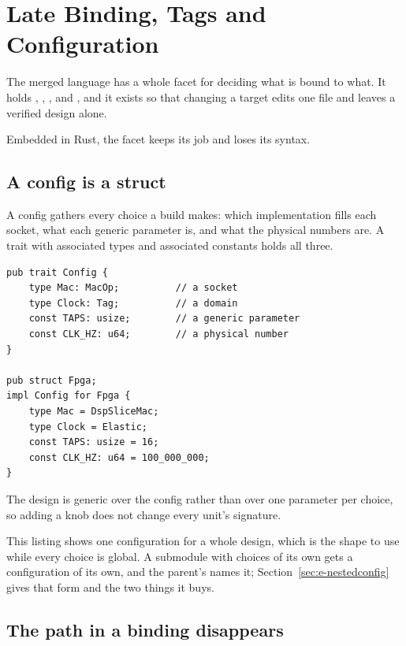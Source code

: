 \section{Late Binding, Tags and Configuration}
\label{sec:e-binding}

The merged language has a whole facet for deciding what is bound to what.
It holds , , ,  and
, and it exists so that changing a target edits one file and
leaves a verified design alone.

Embedded in Rust, the facet keeps its job and loses its syntax.

\subsection{A config is a struct}

A config gathers every choice a build makes: which implementation fills
each socket, what each generic parameter is, and what the physical numbers
are. A trait with associated types and associated constants holds all
three.

\begin{lstlisting}[caption={A config is a struct. Associated types hold the sockets and the domains, associated constants the parameters and the physical numbers.},label={lst:config}]
pub trait Config {
    type Mac: MacOp;          // a socket
    type Clock: Tag;          // a domain
    const TAPS: usize;        // a generic parameter
    const CLK_HZ: u64;        // a physical number
}

pub struct Fpga;
impl Config for Fpga {
    type Mac = DspSliceMac;
    type Clock = Elastic;
    const TAPS: usize = 16;
    const CLK_HZ: u64 = 100_000_000;
}
\end{lstlisting}

The design is generic over the config rather than over one parameter per
choice, so adding a knob does not change every unit's signature.

This listing shows one configuration for a whole design, which is the
shape to use while every choice is global. A submodule with choices of its
own gets a configuration of its own, and the parent's names it;
Section~\ref{sec:e-nestedconfig} gives that form and the two things it
buys.

\subsection{The path in a binding disappears}

